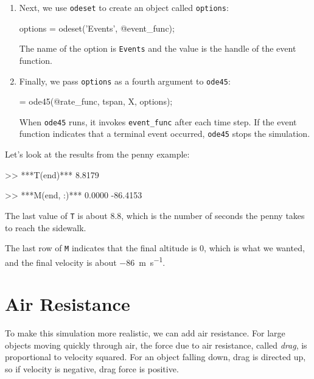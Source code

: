 \begin{enumerate}
\item Next, we use \lstinline{odeset} to create an object called \lstinline{options}:

\begin{code}
options = odeset('Events', @event_func);
\end{code}
%
The name of the option is \lstinline{Events} and the value is the handle of the event function.  

\item Finally, we pass \lstinline{options} as a fourth argument to \lstinline{ode45}:

\begin{code}
[T, M] = ode45(@rate_func, tspan, X, options);
\end{code}

When \lstinline{ode45} runs, it invokes \lstinline{event_func} after each time step.  If the event function indicates that a terminal event occurred, 
\lstinline{ode45} stops the simulation.

\end{enumerate}

Let's look at the results from the penny example:  

\begin{code}
>> ***T(end)***
8.8179

>> ***M(end, :)***
0.0000  -86.4153
\end{code}

The last value of \lstinline{T} is about 8.8, which is the number of seconds the penny takes to reach the sidewalk.

The last row of \lstinline{M} indicates that the final altitude is 0, which is what we wanted, and the final velocity is about \SI{-86}{\meter \per \second}.


\section{Air Resistance}
\label{air_resistance}


To make this simulation more realistic, we can add air resistance.
For large objects moving quickly through air, the force due to air resistance, called \emph{drag}, is proportional to velocity squared.  
For an object falling down, drag is
directed up, so if velocity is negative, drag force is positive.


